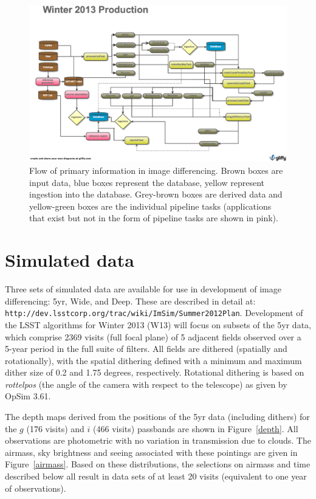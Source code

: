 \documentclass[prd, nofootinbib, floatfix, 11pt,tightenlines,times]{article}
\begin{document}
\begin{figure}
\includegraphics[width=\textwidth]{Figures/Winter_2013.eps}
\caption{Flow of primary information in image differencing. Brown
  boxes are input data, blue boxes represent the database, yellow
  represent ingestion into the database. Grey-brown boxes are derived
  data and yellow-green boxes are the individual pipeline tasks (applications
  that exist but not in the form of pipeline tasks are shown in pink).}
\label{flow}
\end{figure}

\clearpage 

\section{Simulated data} 

Three sets of simulated data are available for use in development of
image differencing: 5yr, Wide, and Deep. These are described in detail
at: \\ {\tt http://dev.lsstcorp.org/trac/wiki/ImSim/Summer2012Plan}.
Development of the LSST algorithms for Winter 2013 (W13) will focus on
subsets of the 5yr data, which comprise 2369 visits (full focal plane)
of 5 adjacent fields observed over a 5-year period in the full suite
of filters. All fields are dithered (spatially and rotationally), with the
spatial dithering defined with a minimum and maximum dither size of
0.2 and 1.75 degrees, respectively. Rotational dithering is based on
{\it rottelpos} (the angle of the camera with respect to the
telescope) as given by OpSim 3.61.

The depth maps derived from the positions of the 5yr data (including
dithers) for the $g$ (176 visits) and $i$ (466 visits) passbands are
shown in Figure~\ref{depth}. All observations are photometric with no
variation in transmission due to clouds. The airmass, sky brightness
and seeing associated with these pointings are given in
Figure~\ref{airmass}. Based on these distributions, the selections on
airmass and time described below all result in data sets of at least
20 visits (equivalent to one year of observations).
\end{document}
